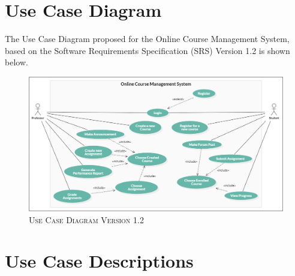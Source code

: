 \documentclass[12pt, a4]{report}
\begin{document}
\maketitle
\newpage
\tableofcontents


\newpage
\chapter{Use Case Diagram}
The Use Case Diagram proposed for the Online Course Management System, based on the Software Requirements Specification (SRS) Version 1.2 is shown below.
\begin{figure}[h]
    \begin{center}
        \includegraphics[width=\textwidth]{Diagrams/Use Case Diagram v1.2.png}
        \textsc{Use Case Diagram Version 1.2}
    \end{center}
\end{figure}


\newpage
\chapter{Use Case Descriptions}

\end{document}
